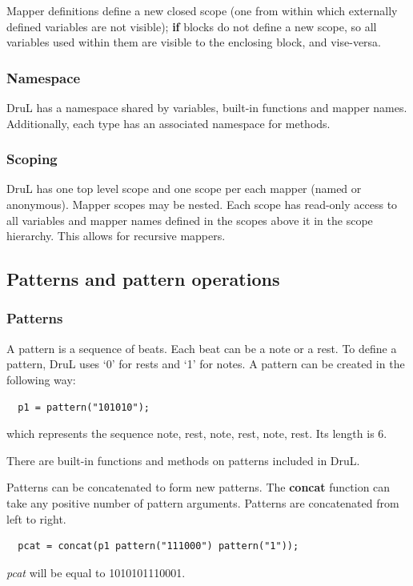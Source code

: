 \documentclass[11pt,twoside]{article}
\begin{document}
Mapper definitions define a new closed scope (one from within which externally defined variables are not visible); \textbf{if} blocks do not define a new scope, so all variables used within them are visible to the enclosing  block, and vise-versa.

\subsubsection{Namespace}

DruL has a namespace shared by variables, built-in functions and 
mapper names. Additionally, each type has an associated namespace for methods.

\subsubsection{Scoping}

DruL has one top level scope and one scope per each mapper
(named or anonymous). Mapper scopes may be nested.
Each scope has read-only access to all variables and mapper names
defined in the scopes above it in the scope hierarchy.
This allows for recursive mappers.





\subsection{Patterns and pattern operations}

\subsubsection{Patterns}

A pattern is a sequence of beats.  Each beat can be a note or a rest.
To define a pattern, DruL uses `0' for rests and `1' for notes.
A pattern can be created in the following way:
\begin{verbatim}
  p1 = pattern("101010");
\end{verbatim}
which represents the sequence {note, rest, note, rest, note, rest}.
Its length is $6$.

There are built-in functions and methods on patterns included in DruL.

Patterns can be concatenated to form new patterns.  The \textbf{concat} function can take any positive number of pattern arguments.  Patterns are concatenated from left to right.
\begin{verbatim}
  pcat = concat(p1 pattern("111000") pattern("1"));
\end{verbatim}
\textit{pcat} will be equal to 1010101110001.
\end{document}
